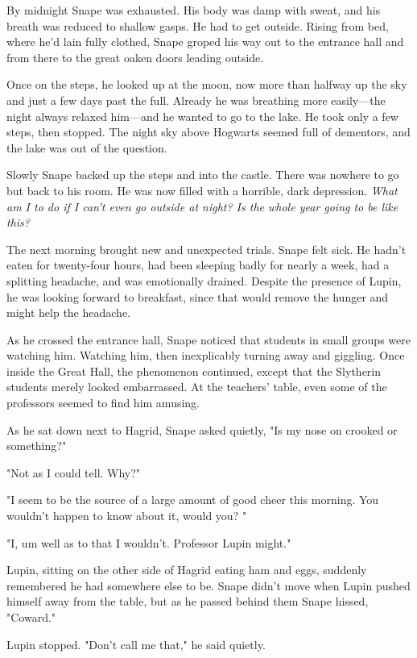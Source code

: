 By midnight Snape was exhausted. His body was damp with sweat, and his breath was reduced to shallow gasps. He had to get outside. Rising from bed, where he'd lain fully clothed, Snape groped his way out to the entrance hall and from there to the great oaken doors leading outside.

Once on the steps, he looked up at the moon, now more than halfway up the sky and just a few days past the full. Already he was breathing more easily—the night always relaxed him—and he wanted to go to the lake. He took only a few steps, then stopped. The night sky above Hogwarts seemed full of dementors, and the lake was out of the question.

Slowly Snape backed up the steps and into the castle. There was nowhere to go but back to his room. He was now filled with a horrible, dark depression. \emph{What am I to do if I can't even go outside at night? Is the whole year going to be like this?}

The next morning brought new and unexpected trials. Snape felt sick. He hadn't eaten for twenty-four hours, had been sleeping badly for nearly a week, had a splitting headache, and was emotionally drained. Despite the presence of Lupin, he was looking forward to breakfast, since that would remove the hunger and might help the headache.

As he crossed the entrance hall, Snape noticed that students in small groups were watching him. Watching him, then inexplicably turning away and giggling. Once inside the Great Hall, the phenomenon continued, except that the Slytherin students merely looked embarrassed. At the teachers' table, even some of the professors seemed to find him amusing.

As he sat down next to Hagrid, Snape asked quietly, "Is my nose on crooked or something?"

"Not as I could tell. Why?"

"I seem to be the source of a large amount of good cheer this morning. You wouldn't happen to know about it, would you? "

"I, um{\el} well as to that{\el} I wouldn't. Professor Lupin might."

Lupin, sitting on the other side of Hagrid eating ham and eggs, suddenly remembered he had somewhere else to be. Snape didn't move when Lupin pushed himself away from the table, but as he passed behind them Snape hissed, "Coward."

Lupin stopped. "Don't call me that," he said quietly.

